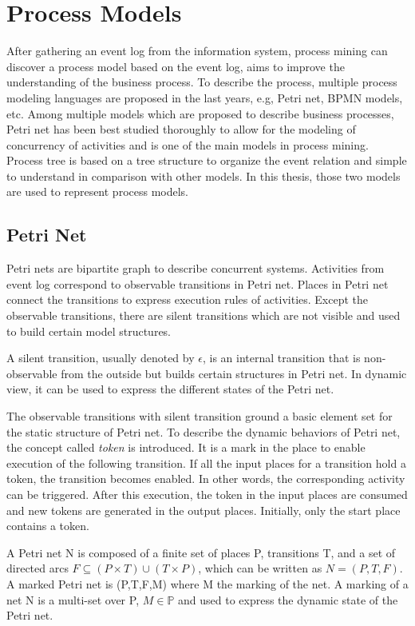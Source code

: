 \section{Process Models}
After gathering an event log from the information system, process mining can discover a process model based on the event log, aims to improve the understanding of the business process. To describe the process, multiple process modeling languages are proposed in the last years, e.g, Petri net, BPMN models, etc. Among multiple models which are proposed to describe business processes, Petri net has been best studied thoroughly to allow for the modeling of concurrency of activities and is one of the main models in process mining. Process tree is based on a tree structure to organize the event relation and simple to understand in comparison with other models. In this thesis, those two models are used to represent process models.
\subsection{Petri Net}
Petri nets are bipartite graph to describe concurrent systems. Activities from event log correspond to observable transitions in Petri net. Places in Petri net connect the transitions to express execution rules of activities. Except the observable transitions, there are silent transitions which are not visible and used to build certain model structures. 
\begin{definition}
	A silent transition, usually denoted by $\epsilon$, is an internal transition that is non-observable from the outside but builds certain structures in Petri net. In dynamic view, it can be used to express the different states of the Petri net. 
\end{definition}
The observable transitions with silent transition ground a basic element set for the static structure of Petri net. To describe the dynamic behaviors of Petri net, the concept called \emph{token} is introduced. It is a mark in the place to enable execution of the following transition. If all the input places for a transition hold a token, the transition becomes enabled. In other words, the corresponding activity can be triggered. After this execution, the token in the input places are consumed and new tokens are generated in the output places. Initially, only the start place contains a token. 
\begin{definition}
	A Petri net N is composed of a finite set of places P, transitions T, and a set of directed arcs $F \subseteq (P \times T) \cup (T \times P)$, which can be written as $N=(P,T,F)$. A marked Petri net is (P,T,F,M) where M the marking of the net. A marking of a net N is a multi-set over P, $M \in \mathbb{P} $ and used to express the dynamic state of the Petri net.
\end{definition}

